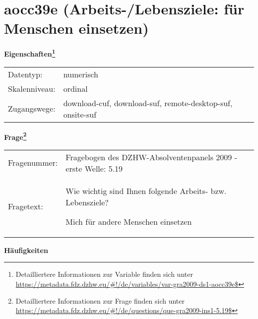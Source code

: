 
    \setcounter{footnote}{0}

    \vspace*{-1.8cm}
	\section{aocc39e (Arbeits-/Lebensziele: für Menschen einsetzen)}
	\label{section:aocc39e}



    \vspace*{0.5cm}
    \noindent\textbf{Eigenschaften\footnote{Detailliertere Informationen zur Variable finden sich unter
		\url{https://metadata.fdz.dzhw.eu/\#!/de/variables/var-gra2009-ds1-aocc39e$}}}\\
	\begin{tabularx}{\hsize}{@{}lX}
	Datentyp: & numerisch \\
	Skalenniveau: & ordinal \\
	Zugangswege: &
	  download-cuf, 
	  download-suf, 
	  remote-desktop-suf, 
	  onsite-suf
 \\
    \end{tabularx}



				\vspace*{0.5cm}
                \noindent\textbf{Frage\footnote{Detailliertere Informationen zur Frage finden sich unter
		              \url{https://metadata.fdz.dzhw.eu/\#!/de/questions/que-gra2009-ins1-5.19$}}}\\
				\begin{tabularx}{\hsize}{@{}lX}
					Fragenummer: &
					  Fragebogen des DZHW-Absolventenpanels 2009 - erste Welle:
					  5.19
 \\
					Fragetext: & Wie wichtig sind Ihnen folgende Arbeits- bzw. Lebensziele?\par  Mich für andere Menschen einsetzen \\
				\end{tabularx}





        		\vspace*{0.5cm}
                \noindent\textbf{Häufigkeiten}

